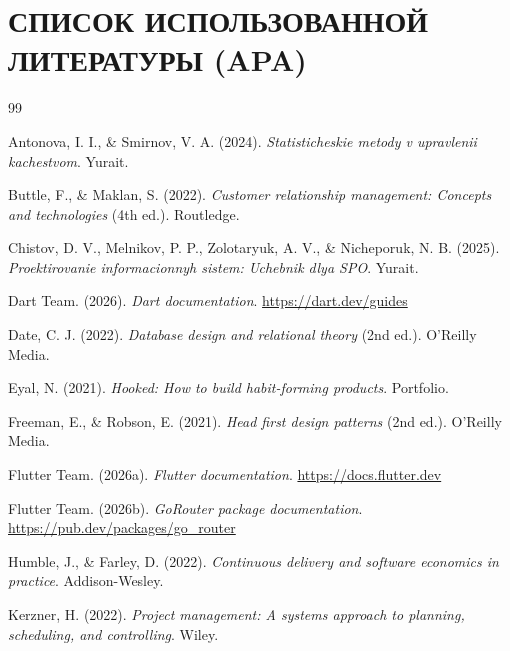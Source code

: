 \clearpage
\section*{СПИСОК ИСПОЛЬЗОВАННОЙ ЛИТЕРАТУРЫ (APA)}

\begingroup
\setlength{\bibhang}{1.25cm}
\setlength{\bibsep}{0.4\baselineskip}
\begin{thebibliography}{99}

Antonova, I. I., \& Smirnov, V. A. (2024). \textit{Statisticheskie metody v upravlenii kachestvom}. Yurait.

Buttle, F., \& Maklan, S. (2022). \textit{Customer relationship management: Concepts and technologies} (4th ed.). Routledge.

Chistov, D. V., Melnikov, P. P., Zolotaryuk, A. V., \& Nicheporuk, N. B. (2025). \textit{Proektirovanie informacionnyh sistem: Uchebnik dlya SPO}. Yurait.

Dart Team. (2026). \textit{Dart documentation}. \url{https://dart.dev/guides}

Date, C. J. (2022). \textit{Database design and relational theory} (2nd ed.). O'Reilly Media.

Eyal, N. (2021). \textit{Hooked: How to build habit-forming products}. Portfolio.

Freeman, E., \& Robson, E. (2021). \textit{Head first design patterns} (2nd ed.). O'Reilly Media.

Flutter Team. (2026a). \textit{Flutter documentation}. \url{https://docs.flutter.dev}

Flutter Team. (2026b). \textit{GoRouter package documentation}. \url{https://pub.dev/packages/go_router}

Humble, J., \& Farley, D. (2022). \textit{Continuous delivery and software economics in practice}. Addison-Wesley.

Kerzner, H. (2022). \textit{Project management: A systems approach to planning, scheduling, and controlling}. Wiley.


\end{thebibliography}
